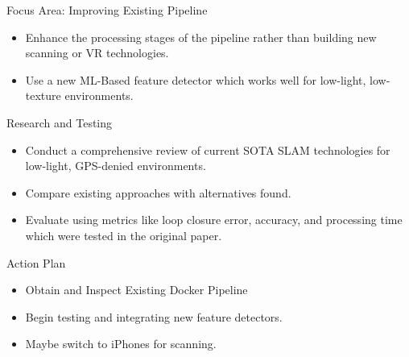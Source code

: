\begin{frame}{Focus Area: Improving Existing Pipeline}
    \begin{itemize}
        \item Enhance the processing stages of the pipeline rather than building new scanning or VR technologies.
        \item Use a new ML-Based feature detector which works well for low-light, low-texture environments.
    \end{itemize}    
\end{frame}

\begin{frame}{Research and Testing}
    \begin{itemize}
        \item Conduct a comprehensive review of current SOTA SLAM technologies for low-light, GPS-denied environments.
        \item Compare existing approaches with alternatives found.
        \item Evaluate using metrics like loop closure error, accuracy, and processing time which were tested in the original paper.
    \end{itemize}    
\end{frame}

\begin{frame}{Action Plan}
    \begin{itemize}
        \item Obtain and Inspect Existing Docker Pipeline
        \item Begin testing and integrating new feature detectors.
        \item Maybe switch to iPhones for scanning.
    \end{itemize}    
\end{frame}
